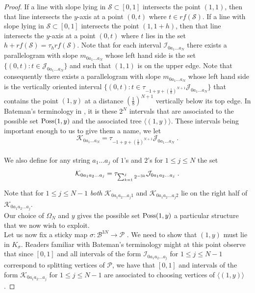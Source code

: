 \documentclass[12pt]{amsart}
\numberwithin{equation}{section}
\theoremstyle{definition}
\theoremstyle{remark}
\begin{document}
\begin{proof}
If a line with slope lying in $\mathcal{S} \subset [0,1]$ intersects the point $(1,1)$, then that line intersects the $y$-axis at a point $(0,t)$ where $t \in rf(\mathcal{S})$. If a line with slope lying in $\mathcal{S} \subset [0,1]$ intersects the point $(1,1+h)$, then that line intersects the $y$-axis at a point $(0,t)$ where $t$ lies in the set $h + rf(\mathcal{S}) = \tau_h rf(\mathcal{S}) $.    Note that for each interval $\mathcal{I}_{0a_1\ldots a_N}$ there exists a parallelogram with slope $m_{0a_1\ldots a_N}$ whose left hand side is the set $\{(0, t) : t\in \mathcal{J}_{0a_1 \ldots a_N}\}$ and such that $(1,1)$ is on the upper edge. Note that consequently there exists a parallelogram with slope $m_{0a_1\ldots a_N}$  whose left hand side is the vertically oriented interval $\{(0, t) : t\in \tau_{-1 + y + (\frac{1}{8})^{N+1}}\mathcal{J}_{0a_1 \ldots a_N}\}$ that contains the point $(1,y)$ at a distance $(\frac{1}{8})^{N+1}$ vertically below its top edge.  In Bateman's terminology in \cite{Ba}, it is these $2^N$ intervals that are associated to the possible set $\textup{Poss}(1,y)$ and the associated tree $\langle(1,y)\rangle$.   These intervals being  important enough to us to give them a name, we let $$\mathcal{K}_{0a_1 \ldots a_N} = \tau_{-1 + y + (\frac{1}{8})^{N+1}}\mathcal{J}_{0a_1 \ldots a_N}\;.$$
\\
We also define for any string $a_1 \ldots a_j$ of $1$'s and $2$'s for $1 \leq j \leq N$ the set $$\mathcal{K}_{0a_1a_2\ldots a_j} = \tau_{%
 \sum_{k=1}^j 2^{-3k}}\mathcal{J}_{0a_1a_2\ldots a_j}\;.$$

Note that for $1 \leq j \leq N-1$  \emph{both} $\mathcal{K}_{0a_1a_2\ldots a_j 1}$ and $\mathcal{K}_{0a_1a_2\ldots a_j 2}$ lie on the right half of $\mathcal{K}_{0a_1a_2\ldots a_j}$\;.
\\

Our choice of $\Omega_N$ and $y$ gives the possible set $\textup{Poss}(1,y)$ a particular structure that we now wish to exploit.
\\



  Let us now fix a sticky map $\sigma: \mathscr{B}^{3N} \rightarrow {\mathscr{P}}$ .   We need to show that $(1,y)$ must lie in $K_\sigma$.  Readers familiar with Bateman's terminology might at this point observe that since $[0,1]$ and all intervals of the form $\mathcal{I}_{0a_1a_2\ldots a_j}$ for $1 \leq j \leq N-1$ correspond to splitting vertices of $\mathscr{P}$,  we have that $[0,1]$ and intervals of the form $\mathcal{K}_{0a_1a_2\ldots a_j}$ for $1 \leq j \leq N-1$ are associated to choosing vertices of $\langle(1,y)\rangle$.  
  

\end{proof}
\end{document}
